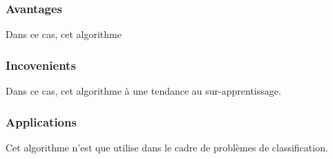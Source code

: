 \documentclass{article}
\begin{document}
\subsubsection{Avantages}
Dans ce cas, cet algorithme 

\subsubsection{Incovenients}
Dans ce cas, cet algorithme à une tendance au sur-apprentissage.

\subsubsection{Applications}
Cet algorithme n'est que utilise dans le cadre de problèmes de classification.




\end{document}
